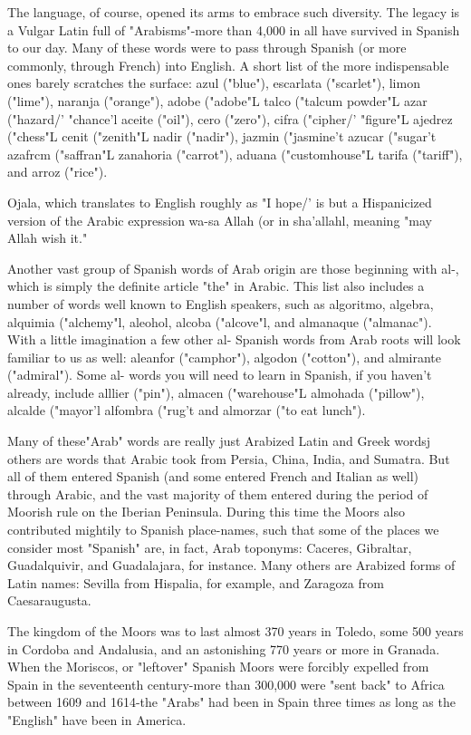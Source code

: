 The language, of course, opened its arms to embrace such
diversity. The legacy is a Vulgar Latin full of "Arabisms"-more
than 4,000 in all have survived in Spanish to our day. Many of these
words were to pass through Spanish (or more commonly, through
French) into English. A short list of the more indispensable ones
barely scratches the surface: azul ("blue"), escarlata ("scarlet"), limon ("lime"), naranja ("orange"), adobe ("adobe"L talco ("talcum
powder"L azar ("hazard/' "chance'l aceite ("oil"), cero ("zero"), cifra
("cipher/' "figure"L ajedrez ("chess"L cenit ("zenith"L nadir ("nadir"),
jazmin ("jasmine't azucar ("sugar't azafrcm ("saffran"L zanahoria
("carrot"), aduana ("customhouse"L tarifa ("tariff"), and arroz ("rice").

Ojala, which translates to English roughly as "I hope/' is but
a Hispanicized version of the Arabic expression wa-sa Allah (or in
sha'allahl, meaning "may Allah wish it."

Another vast group of Spanish words of Arab origin are those
beginning with al-, which is simply the definite article "the" in Arabic. This list also includes a number of words well known to English
speakers, such as algoritmo, algebra, alquimia ("alchemy"l, aleohol,
alcoba ("alcove"l, and almanaque ("almanac"). With a little imagination a few other al- Spanish words from Arab roots will look familiar
to us as well: aleanfor ("camphor"), algodon ("cotton"), and almirante
("admiral"). Some al- words you will need to learn in Spanish, if you
haven't already, include alllier ("pin"), almacen ("warehouse"L almohada ("pillow"), alcalde ("mayor'l alfombra ("rug't and almorzar
("to eat lunch").

Many of these"Arab" words are really just Arabized Latin and
Greek wordsj others are words that Arabic took from Persia, China, India, and Sumatra. But all of them entered Spanish (and some entered
French and Italian as well) through Arabic, and the vast majority of
them entered during the period of Moorish rule on the Iberian Peninsula. During this time the Moors also contributed mightily to Spanish
place-names, such that some of the places we consider most "Spanish"
are, in fact, Arab toponyms: Caceres, Gibraltar, Guadalquivir, and
Guadalajara, for instance. Many others are Arabized forms of Latin
names: Sevilla from Hispalia, for example, and Zaragoza from Caesaraugusta.

The kingdom of the Moors was to last almost 370 years in Toledo, some 500 years in Cordoba and Andalusia, and an astonishing
770 years or more in Granada. When the Moriscos, or "leftover"
Spanish Moors were forcibly expelled from Spain in the seventeenth century-more than 300,000 were "sent back" to Africa between 1609
and 1614-the "Arabs" had been in Spain three times as long as the
"English" have been in America.

